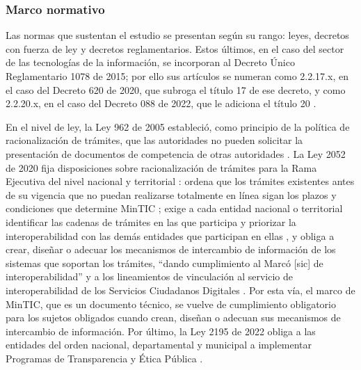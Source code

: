 \subsubsection{Marco normativo}

Las normas que sustentan el estudio se presentan según su rango: leyes, decretos con fuerza de ley y decretos reglamentarios. Estos últimos, en el caso del sector de las tecnologías de la información, se incorporan al Decreto Único Reglamentario 1078 de 2015; por ello sus artículos se numeran como 2.2.17.x, en el caso del Decreto 620 de 2020, que subroga el título 17 de ese decreto, y como 2.2.20.x, en el caso del Decreto 088 de 2022, que le adiciona el título 20 \parencites[art.~1]{colombia2020decreto620}[art.~1]{colombia2022decreto088}.

En el nivel de ley, la Ley 962 de 2005 estableció, como principio de la política de racionalización de trámites, que las autoridades no pueden solicitar la presentación de documentos de competencia de otras autoridades \parencite[art.~1, num.~1]{colombia2005ley962}. La Ley 2052 de 2020 fija disposiciones sobre racionalización de trámites para la Rama Ejecutiva del nivel nacional y territorial \parencite[art.~1]{colombia2020ley2052}: ordena que los trámites existentes antes de su vigencia que no puedan realizarse totalmente en línea sigan los plazos y condiciones que determine MinTIC \parencite[art.~6]{colombia2020ley2052}; exige a cada entidad nacional o territorial identificar las cadenas de trámites en las que participa y priorizar la interoperabilidad con las demás entidades que participan en ellas \parencite[art.~8]{colombia2020ley2052}, y obliga a crear, diseñar o adecuar los mecanismos de intercambio de información de los sistemas que soportan los trámites, \enquote{dando cumplimiento al Marcó [sic] de interoperabilidad} y a los lineamientos de vinculación al servicio de interoperabilidad de los Servicios Ciudadanos Digitales \parencite[art.~10]{colombia2020ley2052}. Por esta vía, el marco de MinTIC, que es un documento técnico, se vuelve de cumplimiento obligatorio para los sujetos obligados cuando crean, diseñan o adecuan sus mecanismos de intercambio de información. Por último, la Ley 2195 de 2022 obliga a las entidades del orden nacional, departamental y municipal a implementar Programas de Transparencia y Ética Pública \parencite[art.~31]{colombia2022ley2195}.

